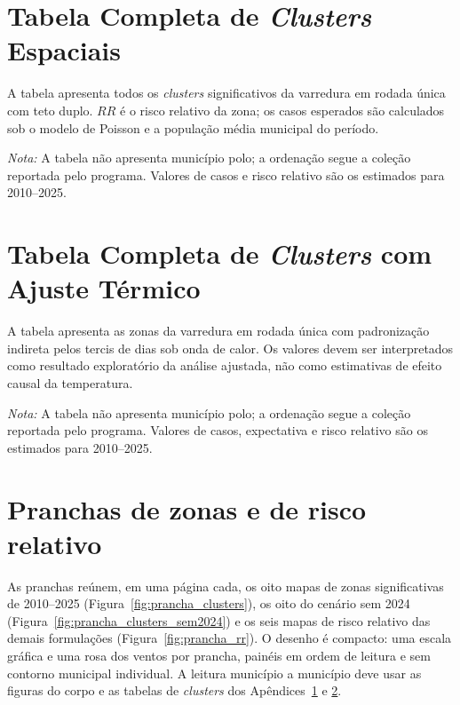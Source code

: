 \apendice
\renewcommand\thechapter{\arabic{chapter}}

\chapter{Tabela Completa de \textit{Clusters} Espaciais}
\label{app:clusters}

A tabela apresenta todos os \textit{clusters} significativos da varredura em rodada única com teto duplo. $RR$ é o risco relativo da zona; os casos esperados são calculados sob o modelo de Poisson e a população média municipal do período.



\par\vspace{0.4em}
\parbox{\linewidth}{\footnotesize\textit{Nota:} A tabela não apresenta município polo; a ordenação segue a coleção reportada pelo programa. Valores de casos e risco relativo são os estimados para 2010--2025.}

\chapter{Tabela Completa de \textit{Clusters} com Ajuste Térmico}
\label{app:clusters_termica}

A tabela apresenta as zonas da varredura em rodada única com padronização indireta pelos tercis de dias sob onda de calor. Os valores devem ser interpretados como resultado exploratório da análise ajustada, não como estimativas de efeito causal da temperatura.



\par\vspace{0.4em}
\parbox{\linewidth}{\footnotesize\textit{Nota:} A tabela não apresenta município polo; a ordenação segue a coleção reportada pelo programa. Valores de casos, expectativa e risco relativo são os estimados para 2010--2025.}

\chapter{Pranchas de zonas e de risco relativo}
\label{app:pranchas}

As pranchas reúnem, em uma página cada, os oito mapas de zonas significativas de 2010--2025 (Figura~\ref{fig:prancha_clusters}), os oito do cenário sem 2024 (Figura~\ref{fig:prancha_clusters_sem2024}) e os seis mapas de risco relativo das demais formulações (Figura~\ref{fig:prancha_rr}). O desenho é compacto: uma escala gráfica e uma rosa dos ventos por prancha, painéis em ordem de leitura e sem contorno municipal individual. A leitura município a município deve usar as figuras do corpo e as tabelas de \textit{clusters} dos Apêndices~\ref{app:clusters} e \ref{app:clusters_termica}.

